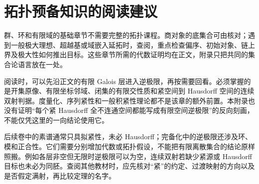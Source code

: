 
\section{拓扑预备知识的阅读建议}
\label{b1:sec:A04}

群、环和有限域的基础章节不需要完整的拓扑课程。商对象的底集合可由核对；遇到一般极大理想、超越基或域嵌入延拓时，查阅，重点检查偏序、初始对象、链上界及极大性如何推出目标。这些章节所需的代数证明均在正文，附录只把共同的集合论语言放在一处。

\ProseParagraphBreak
阅读时，可以先沿正文的有限 Galois 层进入逆极限，再按需要回看。必须掌握的是开集原像、有限坐标邻域、闭集的有限交性质和紧空间到 Hausdorff 空间的连续双射判据。度量化、序列紧性和一般积紧性理论都不是该章的额外前置。本附录也没有证明“每个紧 Hausdorff 全不连通空间都能写成有限空间逆极限”的反向刻画，不能仅凭这里的一向结论使用它。

\ProseParagraphBreak
后续卷中的素谱通常只具拟紧性，未必 Hausdorff；完备化中的逆极限还涉及环、模和正合性。它们需要分别增加代数或拓扑假设，不能把有限离散集合的结论原样照搬。例如各层非空但无限时逆极限可以为空，连续双射若缺少紧源或 Hausdorff 目标也未必为同胚。查阅其他教材时，应先核对“紧”的约定、过渡映射的方向以及是否假定满射，再比较定理的名字。
